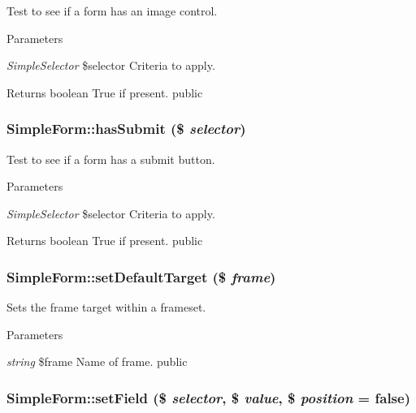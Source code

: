 \label{class_simple_form_aca30d699b068184b79b365dd05dce9a5}
Test to see if a form has an image control. 
\begin{DoxyParams}{Parameters}
\item[{\em SimpleSelector}]\$selector Criteria to apply. \end{DoxyParams}
\begin{DoxyReturn}{Returns}
boolean True if present.  public 
\end{DoxyReturn}
\hypertarget{class_simple_form_a7f285ab460c412548f0bded947b9cbf5}{
\subsubsection[{hasSubmit}]{\setlength{\rightskip}{0pt plus 5cm}SimpleForm::hasSubmit (\$ {\em selector})}}
\label{class_simple_form_a7f285ab460c412548f0bded947b9cbf5}
Test to see if a form has a submit button. 
\begin{DoxyParams}{Parameters}
\item[{\em SimpleSelector}]\$selector Criteria to apply. \end{DoxyParams}
\begin{DoxyReturn}{Returns}
boolean True if present.  public 
\end{DoxyReturn}
\hypertarget{class_simple_form_abe956af62f4b50c7f9a2c7baa4cac055}{
\subsubsection[{setDefaultTarget}]{\setlength{\rightskip}{0pt plus 5cm}SimpleForm::setDefaultTarget (\$ {\em frame})}}
\label{class_simple_form_abe956af62f4b50c7f9a2c7baa4cac055}
Sets the frame target within a frameset. 
\begin{DoxyParams}{Parameters}
\item[{\em string}]\$frame Name of frame.  public \end{DoxyParams}
\hypertarget{class_simple_form_ac4452215cf2bc28e2e5a06e1813162cd}{
\subsubsection[{setField}]{\setlength{\rightskip}{0pt plus 5cm}SimpleForm::setField (\$ {\em selector}, \/  \$ {\em value}, \/  \$ {\em position} = {\ttfamily false})}}
